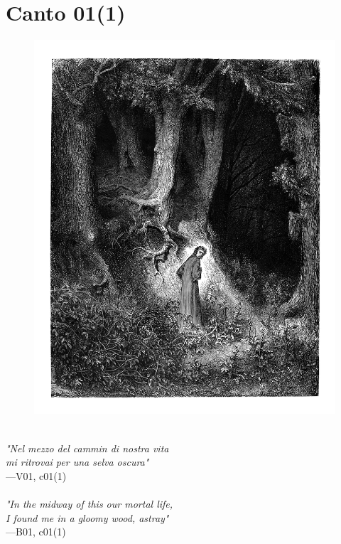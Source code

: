 \documentclass[../Dore_vision.tex]{subfiles}
\begin{document}
\section{Canto 01(1)}

\begin{figure}[ht]
\centering
\includegraphics[height=\figsize]{illustrations/book_1/V01, c01(1).jpg}
\end{figure}

\begin{center}
\begin{minipage}{0.8\linewidth}
\textit{\\
"Nel mezzo del cammin di nostra vita\\mi ritrovai per una selva oscura"} \\
—V01, c01(1) \\~\\
\textit{"In the midway of this our mortal life,\\I found me in a gloomy wood, astray"} \\
—B01, c01(1)
\end{minipage}
\end{center}
\end{document}
